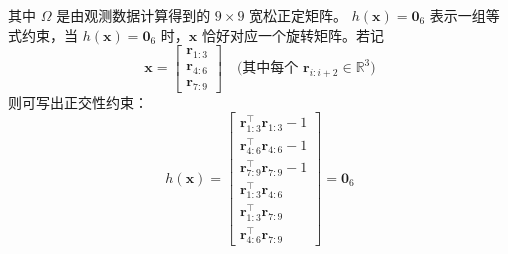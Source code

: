 其中 $\Omega$ 是由观测数据计算得到的 $9\times9$ 宽松正定矩阵。  
$h(\mathbf{x})=\mathbf{0}_6$ 表示一组等式约束，当 $h(\mathbf{x})=\mathbf{0}_6$ 时，$\mathbf{x}$ 恰好对应一个旋转矩阵。若记
\begin{equation}
	\mathbf{x}=
	\begin{bmatrix}
		\mathbf{r}_{1:3}\\[2pt]
		\mathbf{r}_{4:6}\\[2pt]
		\mathbf{r}_{7:9}
	\end{bmatrix}
	\quad
	\text{(其中每个 }\mathbf{r}_{i:i+2}\in\mathbb{R}^3\text{)}
\end{equation}
则可写出正交性约束：
\begin{equation}
	h(\mathbf{x})=
	\begin{bmatrix}
		\mathbf{r}_{1:3}^{\top}\mathbf{r}_{1:3}-1\\
		\mathbf{r}_{4:6}^{\top}\mathbf{r}_{4:6}-1\\
		\mathbf{r}_{7:9}^{\top}\mathbf{r}_{7:9}-1\\
		\mathbf{r}_{1:3}^{\top}\mathbf{r}_{4:6}\\
		\mathbf{r}_{1:3}^{\top}\mathbf{r}_{7:9}\\
		\mathbf{r}_{4:6}^{\top}\mathbf{r}_{7:9}
	\end{bmatrix}
	=\mathbf{0}_6
\end{equation}

